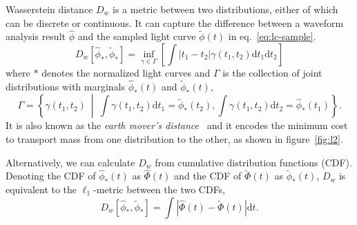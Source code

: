 Wasserstein distance $D_w$ is a metric between two distributions, either of which can be discrete or continuous. It can capture the difference between a waveform analysis result $\hat{\phi}$ and the sampled light curve $\tilde{\phi}(t)$ in eq.~\eqref{eq:lc-sample}.
\begin{equation}
  D_w\left[\hat{\phi}_*, \tilde{\phi}_*\right] = \inf_{\gamma \in \Gamma} \left[\int \left\vert t_1 - t_2 \right\vert \gamma(t_1, t_2)\mathrm{d}t_1\mathrm{d}t_2\right]
\end{equation}
where $*$ denotes the normalized light curves and $\Gamma$ is the collection of joint distributions with marginals $\hat{\phi}_*(t)$ and $\tilde{\phi}_*(t)$,
\begin{equation*}
  \label{eq:joint}
  \Gamma = \left\{\gamma(t_1, t_2) ~\middle\vert~ \int\gamma(t_1,t_2)\mathrm{d}t_1 = \tilde{\phi}_*(t_2) , \int\gamma(t_1,t_2)\mathrm{d}t_2 = \hat{\phi}_*(t_1) \right\}.
\end{equation*}
It is also known as the \textit{earth mover's distance}~\cite{levina_earth_2001} and it encodes the minimum cost to transport mass from one distribution to the other, as shown in figure~\ref{fig:l2}.

Alternatively, we can calculate $D_w$ from cumulative distribution functions (CDF). Denoting the CDF of $\hat{\phi}_*(t)$ as $\hat\Phi(t)$ and the CDF of $\tilde\Phi(t)$ as $\tilde{\phi}_*(t)$, $D_w$ is equivalent to the $\ell_1$-metric between the two CDFs,
\begin{equation}
    D_w\left[\hat{\phi}_*, \tilde{\phi}_*\right] = \int\left|\hat{\Phi}(t) - \tilde{\Phi}(t)\right| \mathrm{d}t.
    \label{eq:numerical}
\end{equation}
